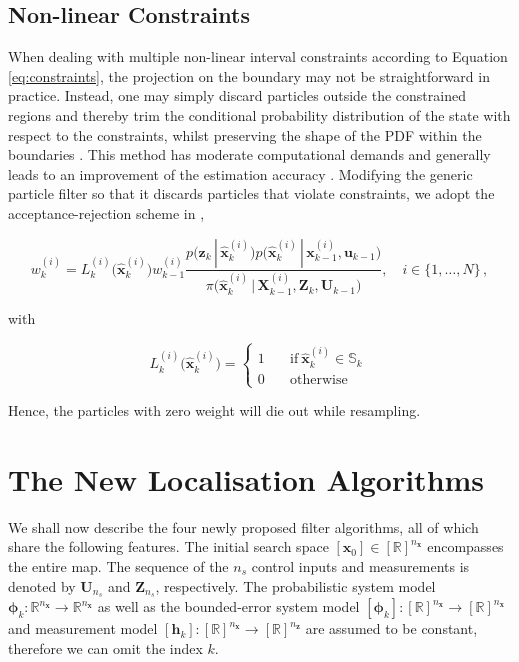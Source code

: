 \subsection{Non-linear Constraints}

When dealing with multiple non-linear interval constraints according to Equation \ref{eq:constraints}, the projection on the boundary may not be straightforward in practice. Instead, one may simply discard particles outside the constrained regions and thereby trim the conditional probability distribution of the state with respect to the constraints, whilst preserving the shape of the PDF within the boundaries \cite{lang2007bayesian}. This method has moderate computational demands and generally leads to an improvement of the estimation accuracy \cite{teixeira2010unscented}. Modifying the generic particle filter so that it discards particles that violate constraints, we adopt the acceptance-rejection scheme in \cite{shao2010constrained},

\begin{equation}\label{eq:weights_new_particle}
   w^{(i)}_k = L^{(i)}_k\big(\hat{\bm{x}}^{(i)}_k\big) w^{(i)}_{k-1} \frac{p\big(\bm{z}_k\,|\,\hat{\bm{x}}^{(i)}_k\big) p\big(\hat{\bm{x}}^{(i)}_k\,|\,\bm{x}^{(i)}_{k-1}, \bm{u}_{k-1}\big)}{\pi\big(\hat{\bm{x}}^{(i)}_k\,|\,\bm{X}^{(i)}_{k-1}, \bm{Z}_{k}, \bm{U}_{k-1}\big)}, \quad i \in \{1, \dots, N\}\,,
\end{equation}

\noindent
with

\begin{equation}\label{eq:truncation_factor}
   L^{(i)}_k\big(\hat{\bm{x}}^{(i)}_k\big) = \begin{cases}
   	1 & \quad \mathrm{if}\:\hat{\bm{x}}^{(i)}_k \in \bm{\mathbb{S}}_k \\
   	0 & \quad \mathrm{otherwise}
   \end{cases}\,
\end{equation}

\noindent
Hence, the particles with zero weight will die out while resampling.


\section{The New Localisation Algorithms}\label{sec:new_filters}

We shall now describe the four newly proposed filter algorithms, all of which share the following features. The initial search space $[\bm{x}_0] \in [\mathbb{R}]^{n_{\bm{x}}}$ encompasses the entire map. The sequence of the $n_s$ control inputs and measurements is denoted by $\bm{U}_{n_s}$ and $\bm{Z}_{n_s}$, respectively. The probabilistic system model $\bm{\phi}_k: \mathbb{R}^{n_{\bm{x}}} \rightarrow \mathbb{R}^{n_{\bm{x}}}$ as well as the bounded-error system model $[\bm{\phi}_k]: [\mathbb{R}]^{n_{\bm{x}}} \rightarrow [\mathbb{R}]^{n_{\bm{x}}}$ and measurement model $[\bm{h}_k]: [\mathbb{R}]^{n_{\bm{x}}} \rightarrow [\mathbb{R}]^{n_{\bm{z}}}$ are assumed to be constant, therefore we can omit the index $k$. 



